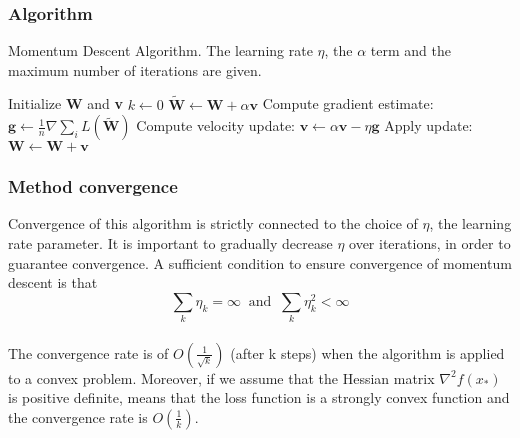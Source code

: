 \subsubsection{Algorithm}
\begin{algorithm}[H]
	\caption{Momentum Descent Algorithm. The learning rate $\eta$, the $\alpha$ term and the maximum number of iterations are given.}
	\label{alg:sgd}
	\begin{algorithmic}[1]
		\State Initialize \textbf{W} and \textbf{v}
		\State $k \gets 0$
		\State $\tilde{\textbf{W}} \gets \textbf{W} + \alpha \textbf{v}$
		\EndIf
		\State Compute gradient estimate: $\textbf{g} \gets \frac {1}{n} \nabla \sum_i\textit{L}(\tilde{\textbf{W}})$
		\State Compute velocity update: $\textbf{v} \gets \alpha \textbf{v} - \eta \textbf{g}$
		\State Apply update: $\textbf{W} \gets \textbf{W} + \textbf{v}$
		\EndWhile
		\EndProcedure
	\end{algorithmic}
\end{algorithm}

\subsubsection{Method convergence}
\label{MDA-convergence}
Convergence of this algorithm is strictly connected to the choice of $\eta$, the learning rate parameter. It is important to gradually decrease $\eta$ over iterations, in order to guarantee convergence. A sufficient condition to ensure convergence of momentum descent is that 
\begin{equation}
\label{assumption:momentum_descent}
\sum_k \eta_k=\infty \  \text{ and } \ \sum_k \eta_k^2 < \infty
\end{equation}
\\
The convergence rate is of $O(\frac{1}{\sqrt{k}})$ (after k steps) when the algorithm is applied to a convex problem. 
Moreover, if we assume that the Hessian matrix $\nabla^2f(x_*)$ is positive definite, means that the loss function is a strongly convex function and the convergence rate is $O(\frac{1}{k})$. \cite{goodfellow}


